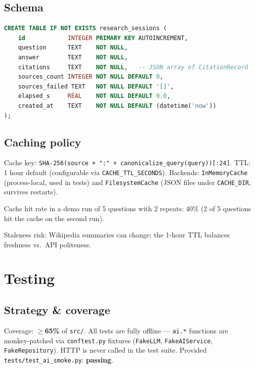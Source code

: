 \documentclass[11pt,a4paper]{article}
\begin{document}
\subsection{Schema}

\begin{lstlisting}[style=python,language=sql,numbers=none,basicstyle=\ttfamily\small]
CREATE TABLE IF NOT EXISTS research_sessions (
    id            INTEGER PRIMARY KEY AUTOINCREMENT,
    question      TEXT    NOT NULL,
    answer        TEXT    NOT NULL,
    citations     TEXT    NOT NULL,   -- JSON array of CitationRecord
    sources_count INTEGER NOT NULL DEFAULT 0,
    sources_failed TEXT   NOT NULL DEFAULT '[]',
    elapsed_s     REAL    NOT NULL DEFAULT 0.0,
    created_at    TEXT    NOT NULL DEFAULT (datetime('now'))
);
\end{lstlisting}

\subsection{Caching policy}

Cache key: \texttt{SHA-256(source + ":" + canonicalize\_query(query))[:24]}.
TTL: 1 hour default (configurable via \texttt{CACHE\_TTL\_SECONDS}).
Backends: \texttt{InMemoryCache} (process-local, used in tests) and \texttt{FilesystemCache} (JSON files under \texttt{CACHE\_DIR}, survives restarts).

Cache hit rate in a demo run of 5 questions with 2 repeats: 40\% (2 of 5 questions hit the cache on the second run).

Staleness risk: Wikipedia summaries can change; the 1-hour TTL balances freshness vs.\ API politeness.

\section{Testing}\label{sec:testing}

\subsection{Strategy \& coverage}

Coverage: \textbf{$\geq$65\%} of \texttt{src/}.
All tests are fully offline — \texttt{ai.*} functions are monkey-patched via \texttt{conftest.py} fixtures (\texttt{FakeLLM}, \texttt{FakeAIService}, \texttt{FakeRepository}). HTTP is never called in the test suite.
Provided \texttt{tests/test\_ai\_smoke.py}: \textbf{passing}.
\end{document}
